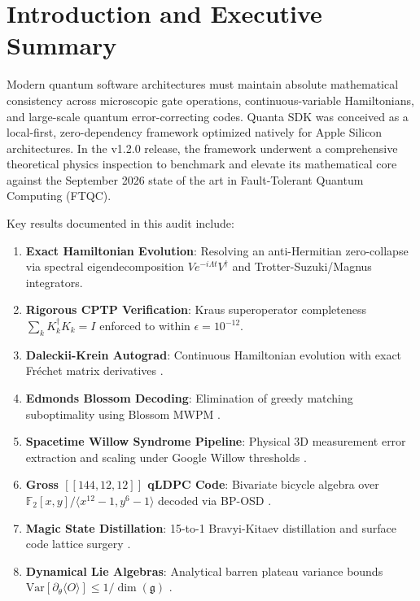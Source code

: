 \documentclass[aps,pra,reprint,superscriptaddress,amsmath,amssymb,floatfix]{revtex4-2}
\begin{document}
\section{Introduction and Executive Summary}
Modern quantum software architectures must maintain absolute mathematical consistency across microscopic gate operations, continuous-variable Hamiltonians, and large-scale quantum error-correcting codes. Quanta SDK was conceived as a local-first, zero-dependency framework optimized natively for Apple Silicon architectures. In the v1.2.0 release, the framework underwent a comprehensive theoretical physics inspection to benchmark and elevate its mathematical core against the September 2026 state of the art in Fault-Tolerant Quantum Computing (FTQC).

Key results documented in this audit include:
\begin{enumerate}
    \item \textbf{Exact Hamiltonian Evolution}: Resolving an anti-Hermitian zero-collapse via spectral eigendecomposition $V e^{-i \Lambda t} V^\dagger$ and Trotter-Suzuki/Magnus integrators.
    \item \textbf{Rigorous CPTP Verification}: Kraus superoperator completeness $\sum_k K_k^\dagger K_k = I$ enforced to within $\epsilon = 10^{-12}$.
    \item \textbf{Daleckii-Krein Autograd}: Continuous Hamiltonian evolution with exact Fréchet matrix derivatives \cite{daleckii1974stability, mathias1996chain, schuld2019evaluating}.
    \item \textbf{Edmonds Blossom Decoding}: Elimination of greedy matching suboptimality using Blossom MWPM \cite{edmonds1965paths, kolmogorov2009blossom, higgott2022pymatching}.
    \item \textbf{Spacetime Willow Syndrome Pipeline}: Physical 3D measurement error extraction and scaling under Google Willow thresholds \cite{google2023suppressing, fowler2012surface}.
    \item \textbf{Gross $[[144, 12, 12]]$ qLDPC Code}: Bivariate bicycle algebra over $\mathbb{F}_2[x,y]/\langle x^{12}-1, y^6-1\rangle$ decoded via BP-OSD \cite{bravyi2024high, panteleev2021degenerate, roffe2020decoding}.
    \item \textbf{Magic State Distillation}: 15-to-1 Bravyi-Kitaev distillation \cite{bravyi2005universal} and surface code lattice surgery \cite{horsman2012surface}.
    \item \textbf{Dynamical Lie Algebras}: Analytical barren plateau variance bounds $\text{Var}[\partial_\theta \langle O \rangle] \le 1/\dim(\mathfrak{g})$ \cite{mcclean2018barren, fontana2024adjoint}.
\end{enumerate}
\end{document}
